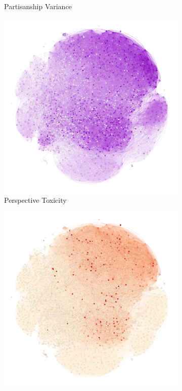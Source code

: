\begin{figure}
\begin{subfigure}{.24\textwidth}
  \caption{Partisanship Variance}
  \label{fig:twitter-variance-partisanship}
\end{subfigure}
\begin{subfigure}{.24\textwidth}
  \centering
  \includegraphics[width=1\linewidth]{figures/toxicity-graph.png}
  \caption{Perspective Toxicity }
  \label{fig:twitter-toxicity}
\end{subfigure}
\begin{subfigure}{.24\textwidth}
  \centering
  \includegraphics[width=1\linewidth]{figures/misinformation-graph.png}

\end{subfigure}
\end{figure}
